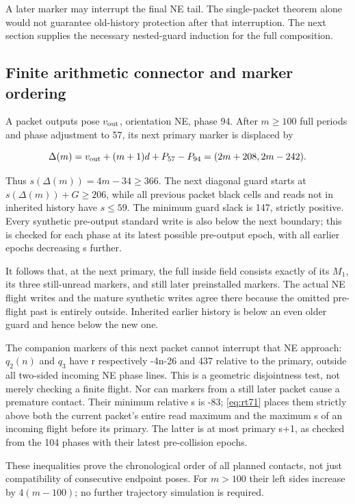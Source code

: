 A later marker may interrupt the final NE tail. The single-packet
theorem alone would not guarantee old-history protection after that
interruption. The next section supplies the necessary nested-guard
induction for the full composition.

\subsection{Finite arithmetic connector and marker
ordering}\label{returns-7}

A packet outputs pose $v_{\rm out}$, orientation NE, phase 94. After
$m\ge100$ full periods and phase adjustment to 57, its next
primary marker is displaced by

\begin{equation}\label{eq:rt71}
\Delta(m)=v_{\rm out}+(m+1)d+P_{57}-P_{94}=(2m+208,2m-242).
\end{equation}

Thus \(s(\Delta(m))=4m-34\ge366\). The next diagonal guard starts
at \(s(\Delta(m))+G\ge206\), while all previous packet black cells
and reads not in inherited history have $s\le59$. The minimum guard
slack is 147, strictly positive. Every synthetic pre-output standard
write is also below the next boundary; this is checked for each phase at
its latest possible pre-output epoch, with all earlier epochs decreasing
s further.

It follows that, at the next primary, the full inside field consists
exactly of its $M_1$, its three still-unread markers, and still later
preinstalled markers. The actual NE flight writes and the mature
synthetic writes agree there because the omitted pre-flight past is
entirely outside. Inherited earlier history is below an even older guard
and hence below the new one.

The companion markers of this next packet cannot interrupt that NE
approach: $q_2(n)$ and $q_3$ have r respectively -4n-26 and 437 relative to
the primary, outside all two-sided incoming NE phase lines. This is a
geometric disjointness test, not merely checking a finite flight. Nor
can markers from a still later packet cause a premature contact. Their
minimum relative s is -83; \eqref{eq:rt71} places them strictly above both the
current packet's entire read maximum and the maximum s of an incoming
flight before its primary. The latter is at most primary s+1, as checked
from the 104 phases with their latest pre-collision epochs.

These inequalities prove the chronological order of all planned
contacts, not just compatibility of consecutive endpoint poses. For
$m>100$ their left sides increase by $4(m-100)$; no further
trajectory simulation is required.

